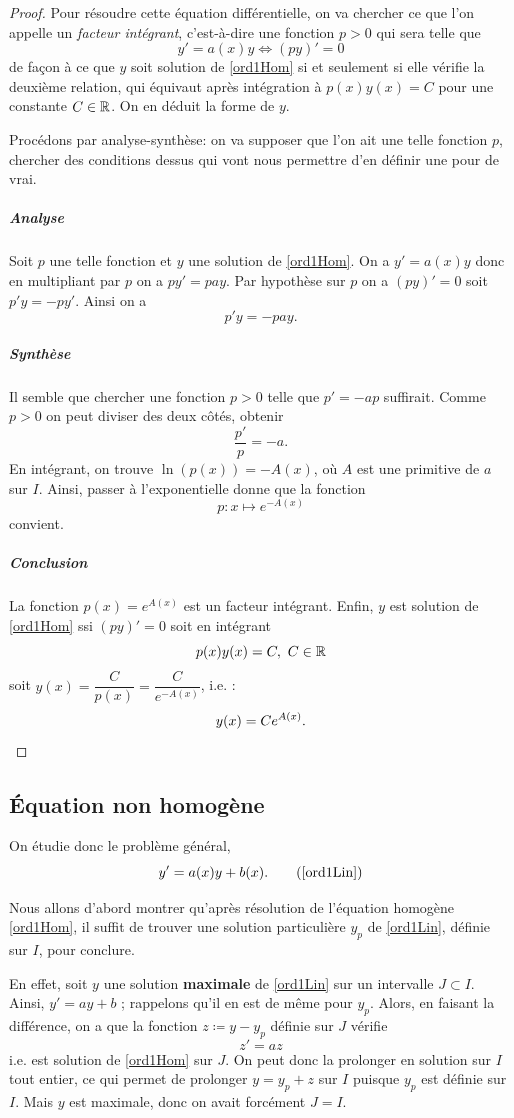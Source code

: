 \documentclass[../main.tex]{subfiles}
\begin{document}
\begin{proof}
Pour résoudre cette équation différentielle, on va chercher ce que l'on appelle un \textit{facteur intégrant}, c'est-à-dire une fonction $p>0$ qui sera telle que
	\[
    y' = a(x)y\Longleftrightarrow
    (py)' = 0
    \]
de façon à ce que $y$ soit solution de \eqref{ord1Hom} si et seulement si elle vérifie la deuxième relation, qui équivaut après intégration à $p(x)y(x) = C$ pour une constante $C\in\mathbb R$. On en déduit la forme de $y$.

Procédons par analyse-synthèse: on va supposer que l'on ait une telle fonction $p$, chercher des conditions dessus qui vont nous permettre d'en définir une pour de vrai.

\subparagraph{Analyse} Soit $p$ une telle fonction et $y$ une solution de \eqref{ord1Hom}. On a $y' = a(x)y$ donc en multipliant par $p$ on a $py' = pay$. Par hypothèse sur $p$ on a $(py)' = 0$ soit $p'y = - py'$. Ainsi on a \[p'y = -pay.\]

\subparagraph{Synthèse} Il semble que chercher une fonction $p>0$ telle que $p' = -ap$ suffirait. Comme $p>0$ on peut diviser des deux côtés, obtenir
	\begin{equation*}
    \frac{p'}{p} = -a.
    \end{equation*}
En intégrant, on trouve $\ln(p(x)) = -A(x)$, où $A$ est une primitive de $a$ sur $I$. Ainsi, passer à l'exponentielle donne que la fonction \[p:x\longmapsto e^{-A(x)}\] 
convient.

\subparagraph{Conclusion} La fonction $p(x)=e^{A(x)}$ est un facteur intégrant. Enfin, $y$ est solution de \eqref{ord1Hom} ssi $(py)'=0$ soit en intégrant
	\[
    p(x)y(x) = C,\ C\in\R
    \]
soit $y(x) = \dfrac{C}{p(x)}=\dfrac{C}{e^{-A(x)}}$, i.e. :
	\[
	y(x) = Ce^{A(x)}.\qedhere
	\]
\end{proof}

\subsection{Équation non homogène}

On étudie donc le problème général,
	\[
    y' = a(x)y + b(x).
    \tag{\ref{ord1Lin}}
    \]

Nous allons d'abord montrer qu'après résolution de l'équation homogène \eqref{ord1Hom}, il suffit de trouver une solution particulière $y_p$ de \eqref{ord1Lin}, définie sur $I$, pour conclure.

En effet, soit $y$ une solution \textbf{maximale} de \eqref{ord1Lin} sur un intervalle $J\subset I$. Ainsi, $y' = ay + b$ ; rappelons qu'il en est de même pour $y_p$. Alors, en faisant la différence, on a que la fonction $z\coloneqq y-y_p$ définie sur $J$ vérifie
	\[ 
	z' = az
	 \]
i.e. est solution de \eqref{ord1Hom} sur $J$. On peut donc la prolonger en solution sur $I$ tout entier, ce qui permet de prolonger $y = y_p + z$ sur $I$ puisque $y_p$ est définie sur $I$. Mais $y$ est maximale, donc on avait forcément $J=I$.
\end{document}
